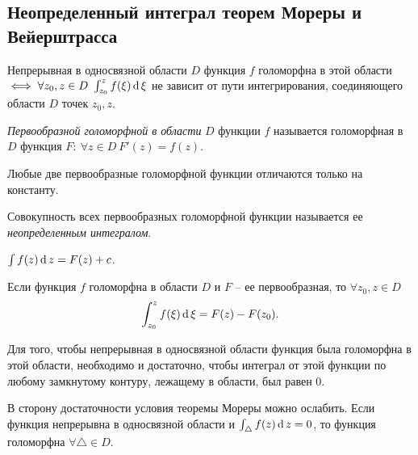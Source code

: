 \subsection{Неопределенный интеграл теорем Мореры и Вейерштрасса}

\begin{theorem}
	Непрерывная в односвязной области $D$ функция $f$ голоморфна в этой области $\iff \forall z_0,z \in D \ \int_{z_0}^{z} f(\xi )\operatorname{d} \xi $ не зависит от пути интегрирования, соединяющего области $D$ точек $z_0,z$.
\end{theorem}

\begin{definition}
	\emph{Первообразной голоморфной в области} $D$ функции $f$ называется голоморфная в $D$ функция $F: \ \forall  z \in D \ F '(z) = f(z)$.
\end{definition}

\begin{remark}
	Любые две первообразные голоморфной функции отличаются только на константу.
\end{remark}

\begin{definition}
	Совокупность всех первообразных голоморфной функции называется ее \emph{неопределенным интегралом}.
	\begin{notation}
		$\int f(z)\operatorname{d} z = F(z) + c $.
	\end{notation}
\end{definition}

\begin{remark}
	Если функция $f$ голоморфна в области $D$ и $F$ -- ее первообразная, то $\forall z_0,z \in D$
	\[
		\int_{z_0}^{z} f(\xi )\operatorname{d} \xi = F(z) - F(z_0).
	\]
\end{remark}

\begin{theorem}[Морера]
	Для того, чтобы непрерывная в односвязной области функция была голоморфна в этой области, необходимо и достаточно, чтобы интеграл от этой функции по любому замкнутому контуру, лежащему в области, был равен $0$.
\end{theorem}

\begin{remark}
	В сторону достаточности условия теоремы Мореры можно ослабить. Если функция непрерывна в односвязной области и $\int_{\triangle} f(z)\operatorname{d} z = 0$, то функция голоморфна $\forall \triangle \in D$.
\end{remark}

